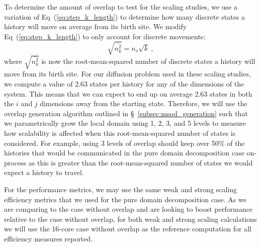 To determine the amount of overlap to test for the scaling studies, we
use a variation of Eq~(\ref{eq:step_k_length}) to determine how many
discrete states a history will move on average from its birth site. We
modify Eq~(\ref{eq:step_k_length}) to only account for discrete
movements:
\begin{equation}
  \sqrt{\bar{n^2_k}} = n_s \sqrt{k}\:,
  \label{eq:discrete_distance}
\end{equation}
where $\sqrt{\bar{n^2_k}}$ is now the root-mean-squared number of
discrete states a history will move from its birth site. For our
diffusion problem used in these scaling studies, we compute a value of
2.63 states per history for any of the dimensions of the system. This
means that we can expect to end up on average 2.63 states in both the
$i$ and $j$ dimensions away from the starting state. Therefore, we
will use the overlap generation algorithm outlined in
\S~\ref{subsec:msod_generation} such that we parametrically grow the
local domain using 1, 2, 3, and 5 levels to measure how scalability is
affected when this root-mean-squared number of states is
considered. For example, using 3 levels of overlap should keep over
50\% of the histories that would be communicated in the pure domain
decomposition case on-process as this is greater than the
root-mean-squared number of states we would expect a history to
travel.

For the performance metrics, we may use the same weak and strong
scaling efficiency metrics that we used for the pure domain
decomposition case. As we are comparing to the case without overlap
and are looking to boost performance relative to the case without
overlap, for both weak and strong scaling calculations we will use the
16-core case without overlap as the reference computation for all
efficiency measures reported. 

